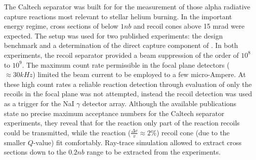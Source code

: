The Caltech separator was built for for the measurement of those alpha radiative capture reactions most relevant to stellar helium burning. In the important energy regime, cross sections of below $1 \unit{nb}$ and recoil cones above 15 mrad were expected. The setup was used for two published experiments: the design benchmark \reac{\alpha}{\gamma} \cite{krem88} and a determination of the direct capture component of \reac{\alpha}{\gamma} \cite{hahn87}. In both experiments, the recoil separator provided a beam suppression of the order of $10^8$ to $10^9$. The maximum count rate permissible in the focal plane detectors ($\approx 30 \unit{kHz}$) limited the beam current to be employed to a few micro-Ampere. At these high count rates a reliable reaction detection through evaluation of only the recoils in the focal plane was not attempted, instead the recoil detection was used as a trigger for the NaI $\gamma$ detector array. Although the available publications state no precise maximum acceptance numbers for the Caltech separator experiments, they reveal that for the \reac{\alpha}{\gamma} reaction only part of the reaction recoils could be transmitted, while the \reac{\alpha}{\gamma} reaction ($\frac{\Delta{}v}{v} \approx 2 \%$) recoil cone (due to the smaller $Q$-value) fit comfortably. Ray-trace simulation allowed to extract cross sections down to the $0.2 \unit{nb}$ range to be extracted from the experiments.\\ 
